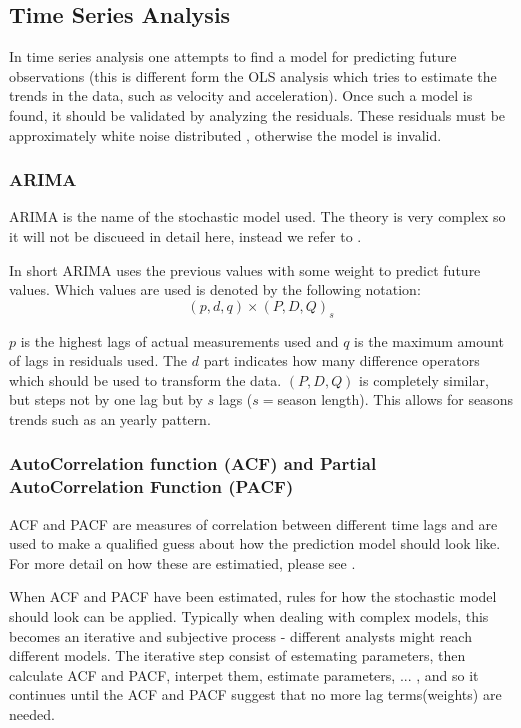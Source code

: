 \subsection{Time Series Analysis}

In time series analysis one attempts to find a model for predicting future observations
(this is different form the OLS analysis which tries to estimate the trends in the data, such as velocity and acceleration).
 Once such a model is found, it should be validated by analyzing the residuals. These residuals must be approximately white noise distributed \cite[p.~130]{time-series-analysis}, otherwise the model is invalid. 

\subsubsection{ARIMA}

ARIMA is the name of the stochastic model used. The theory is very complex so it will not be discueed in detail here, instead we refer to \cite[p.~130]{time-series-analysis}.

In short ARIMA uses the previous values with some weight to predict future values. Which values are used is denoted by the following notation:
\begin{equation}
(p, d, q) \times (P, D, Q)_s
\end{equation}

$p$ is the highest lags of actual measurements used and $q$ is the maximum amount of lags in residuals used. The $d$ part indicates how many difference operators which should be used to transform the data. $(P, D, Q)$ is completely similar, but steps not by one lag but by $s$ lags ($s=$season length). This allows for seasons trends such as an yearly pattern.

\subsubsection{AutoCorrelation function (ACF) and Partial AutoCorrelation Function (PACF)}
 
ACF and PACF are measures of correlation between different time lags and are used to make a qualified guess about how the prediction model should look like. 
For more detail on how these are estimatied, please see \cite[p.~146]{time-series-analysis}.

When ACF and PACF have been estimated, rules \cite[table~6.1]{time-series-analysis} for how the stochastic model should look can be applied.
Typically when dealing with complex models, this becomes an iterative and subjective process - different analysts might reach different models.
The iterative step consist of estemating parameters, then calculate ACF and PACF, interpet them, estimate parameters, ... , and so it continues until the ACF and PACF suggest that no more lag terms(weights) are needed.

